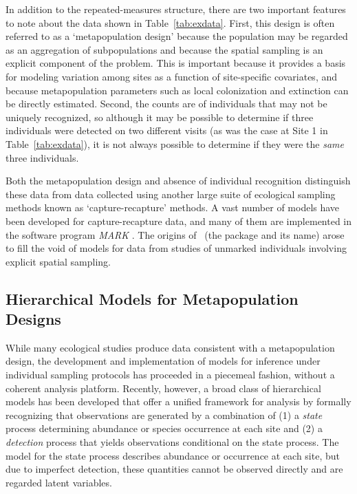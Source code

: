 \documentclass[article,shortnames]{jss}
\newcommand{\um}{\pkg{unmarked}}
\begin{document}
In addition to the repeated-measures structure, there are two important
features to note about the data shown in Table~\ref{tab:exdata}.  First,
this design is often referred to as a `metapopulation design' because
the population may be regarded as an aggregation of subpopulations and
because the spatial sampling is an explicit component of the problem.
This is important because it provides a basis for modeling variation
among sites as a function of site-specific covariates, and because
metapopulation parameters such as local colonization and extinction
can be directly estimated. Second, the counts are of individuals that
may not be uniquely recognized, so although it may be possible to
determine if three individuals were detected on two different visits
(as was the case at Site 1 in Table~\ref{tab:exdata}), it is not always
possible to determine if they were the {\it same} three individuals.

Both the metapopulation design and absence of individual recognition
distinguish these data from data collected using another large suite of
ecological sampling methods known as `capture-recapture' methods. A vast number
of models have been developed for capture-recapture data, and many of them
are implemented in the software program \emph{MARK}
\citep{whiteBurnham99_MARK}. The origins of \um\ (the package and its name)
arose to fill the void of models for data from studies of unmarked
individuals involving explicit spatial sampling.

\subsection{Hierarchical Models for Metapopulation Designs}

While many ecological studies produce data consistent with a
metapopulation design, the development and implementation of
models for inference under individual sampling protocols has
proceeded in a piecemeal fashion, without a coherent analysis
platform. Recently, however, a broad
class of hierarchical models \citetext{see \citet{royleDorazio08} for a
general treatment} has been developed that offer a unified
framework for analysis by formally recognizing that observations are
generated by a combination of (1) a \emph{state} process
determining abundance or species occurrence at each site and (2) a
\emph{detection} process that yields observations conditional on the
state process. The model for the state process describes abundance or
occurrence at each site, but due to imperfect detection, these quantities
cannot be observed directly and are regarded latent variables.
\end{document}
